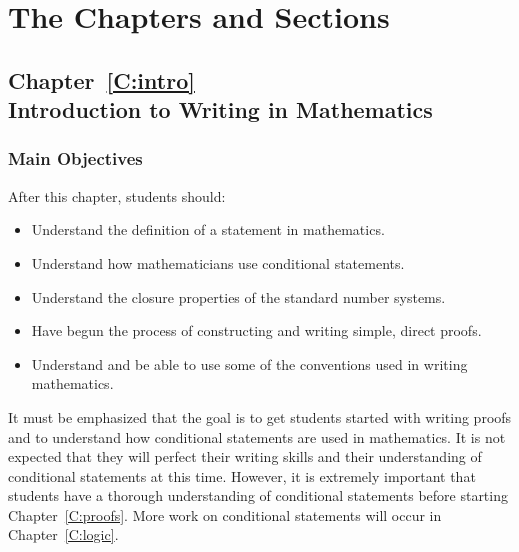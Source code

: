 \part{The Chapters and Sections}
\chapter*{Chapter~\ref{C:intro} \\Introduction to Writing in Mathematics}

\section*{Main Objectives}
After this chapter, students should:
\begin{itemize}
\item Understand the definition of a statement in mathematics.
\item Understand how mathematicians use conditional statements.
\item Understand the closure properties of the standard number systems.
\item Have begun the process of constructing and writing simple, direct proofs.
\item Understand and be able to use some of the conventions used in writing mathematics.

\end{itemize}

It must be emphasized that the goal is to get students started with writing proofs and to understand how conditional statements are used in mathematics.  It is not expected that they will perfect their writing skills and their understanding of conditional statements at this time.  However, it is extremely important that students have a thorough understanding of conditional statements before starting Chapter~\ref{C:proofs}.  More work on conditional statements will occur in Chapter~\ref{C:logic}.
\hbreak

